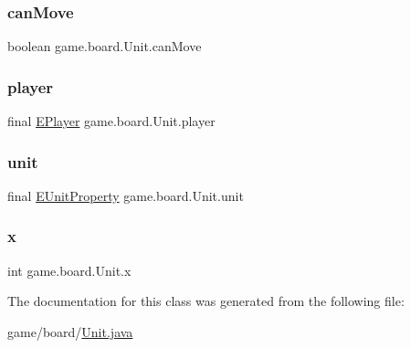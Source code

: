 \subsubsection{\texorpdfstring{can\+Move}{canMove}}
{\footnotesize\ttfamily boolean game.\+board.\+Unit.\+can\+Move\hspace{0.3cm}{\ttfamily [private]}}

\mbox{\label{classgame_1_1board_1_1_unit_a34d0e94c098e91431f95bdd4ae56f4e2}} 
\subsubsection{\texorpdfstring{player}{player}}
{\footnotesize\ttfamily final \mbox{\hyperlink{enumgame_1_1_e_player}{E\+Player}} game.\+board.\+Unit.\+player\hspace{0.3cm}{\ttfamily [private]}}

\mbox{\label{classgame_1_1board_1_1_unit_aa705b919e02dc57b8084bbdc57840f68}} 
\subsubsection{\texorpdfstring{unit}{unit}}
{\footnotesize\ttfamily final \mbox{\hyperlink{enumrule_engine_1_1entity_1_1_e_unit_property}{E\+Unit\+Property}} game.\+board.\+Unit.\+unit\hspace{0.3cm}{\ttfamily [private]}}

\mbox{\label{classgame_1_1board_1_1_unit_a98cffe207391fa08955cd64f71044e38}} 
\subsubsection{\texorpdfstring{x}{x}}
{\footnotesize\ttfamily int game.\+board.\+Unit.\+x\hspace{0.3cm}{\ttfamily [private]}}



The documentation for this class was generated from the following file\+:\begin{DoxyCompactItemize}
\item 
game/board/\mbox{\hyperlink{_unit_8java}{Unit.\+java}}\end{DoxyCompactItemize}
